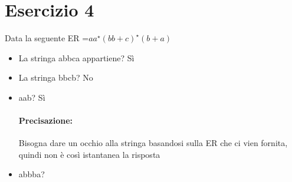 \documentclass[12pt, a4paper, openany, oneside]{book}
\begin{document}
\section{Esercizio 4}
Data la seguente ER =$aa^{\star}(bb+c)^{\star}(b+a)$
\begin{itemize}
	\item La stringa abbca appartiene? Sì
	\item La stringa bbcb? No
	\item aab? Sì
	\paragraph{Precisazione: }Bisogna dare un occhio alla stringa basandosi sulla 
	ER che ci vien fornita, quindi non è così istantanea la risposta
	\item abbba? 
\end{itemize}
\end{document}
